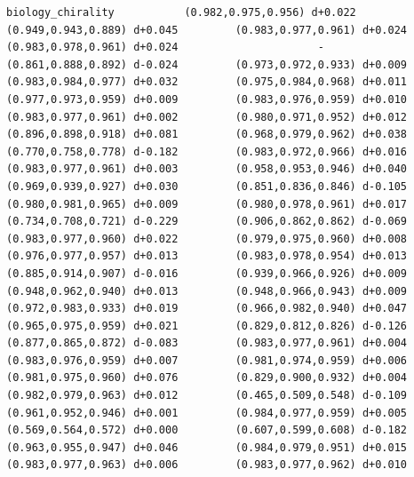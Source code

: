 \documentclass[11pt, letterpaper, openany]{book}
\begin{document}
\begin{empiricalbox}
\begin{lstlisting}[style=terminal]
biology_chirality           (0.982,0.975,0.956) d+0.022         (0.949,0.943,0.889) d+0.045         (0.983,0.977,0.961) d+0.024         (0.983,0.978,0.961) d+0.024                      -                      (0.861,0.888,0.892) d-0.024         (0.973,0.972,0.933) d+0.009         (0.983,0.984,0.977) d+0.032         (0.975,0.984,0.968) d+0.011         (0.977,0.973,0.959) d+0.009         (0.983,0.976,0.959) d+0.010         (0.983,0.977,0.961) d+0.002         (0.980,0.971,0.952) d+0.012         (0.896,0.898,0.918) d+0.081         (0.968,0.979,0.962) d+0.038         (0.770,0.758,0.778) d-0.182         (0.983,0.972,0.966) d+0.016         (0.983,0.977,0.961) d+0.003         (0.958,0.953,0.946) d+0.040         (0.969,0.939,0.927) d+0.030         (0.851,0.836,0.846) d-0.105         (0.980,0.981,0.965) d+0.009         (0.980,0.978,0.961) d+0.017         (0.734,0.708,0.721) d-0.229         (0.906,0.862,0.862) d-0.069         (0.983,0.977,0.960) d+0.022         (0.979,0.975,0.960) d+0.008         (0.976,0.977,0.957) d+0.013         (0.983,0.978,0.954) d+0.013         (0.885,0.914,0.907) d-0.016         (0.939,0.966,0.926) d+0.009         (0.948,0.962,0.940) d+0.013         (0.948,0.966,0.943) d+0.009         (0.972,0.983,0.933) d+0.019         (0.966,0.982,0.940) d+0.047         (0.965,0.975,0.959) d+0.021         (0.829,0.812,0.826) d-0.126         (0.877,0.865,0.872) d-0.083         (0.983,0.977,0.961) d+0.004         (0.983,0.976,0.959) d+0.007         (0.981,0.974,0.959) d+0.006         (0.981,0.975,0.960) d+0.076         (0.829,0.900,0.932) d+0.004         (0.982,0.979,0.963) d+0.012         (0.465,0.509,0.548) d-0.109         (0.961,0.952,0.946) d+0.001         (0.984,0.977,0.959) d+0.005         (0.569,0.564,0.572) d+0.000         (0.607,0.599,0.608) d-0.182         (0.963,0.955,0.947) d+0.046         (0.984,0.979,0.951) d+0.015         (0.983,0.977,0.963) d+0.006         (0.983,0.977,0.962) d+0.010     

\end{lstlisting}
\end{empiricalbox}
\end{document}
